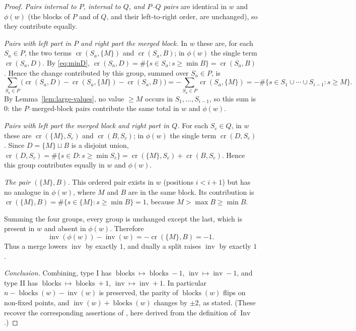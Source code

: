 \documentclass[11pt]{amsart}
\theoremstyle{definition}
\DeclareMathOperator{\inv}{inv}
\DeclareMathOperator{\Inv}{Inv}
\DeclareMathOperator{\blocks}{blocks}
\begin{document}
\begin{proof}
\emph{Pairs internal to $P$, internal to $Q$, and $P$–$Q$ pairs} are identical in
$w$ and $\phi(w)$ (the blocks of $P$ and of $Q$, and their left-to-right order,
are unchanged), so they contribute equally.

\emph{Pairs with left part in $P$ and right part the merged block.} In $w$ these
are, for each $S_a\in P$, the two terms $\operatorname{cr}(S_a,\{M\})$ and
$\operatorname{cr}(S_a,B)$; in $\phi(w)$ the single term
$\operatorname{cr}(S_a,D)$. By \eqref{eq:minD},
$\operatorname{cr}(S_a,D)=\#\{s\in S_a:s\ge\min B\}=\operatorname{cr}(S_a,B)$.
Hence the change contributed by this group, summed over $S_a\in P$, is
\[
\sum_{S_a\in P}\Big(\operatorname{cr}(S_a,D)-\operatorname{cr}(S_a,\{M\})-\operatorname{cr}(S_a,B)\Big)
=-\sum_{S_a\in P}\operatorname{cr}(S_a,\{M\})
=-\#\{s\in S_1\cup\cdots\cup S_{i-1}: s\ge M\}.
\]
By Lemma~\ref{lem:large-values}, no value $\ge M$ occurs in $S_1,\dots,S_{i-1}$,
so this sum is $0$: the $P$–merged-block pairs contribute the same total in $w$
and $\phi(w)$.

\emph{Pairs with left part the merged block and right part in $Q$.} For each
$S_c\in Q$, in $w$ these are $\operatorname{cr}(\{M\},S_c)$ and
$\operatorname{cr}(B,S_c)$; in $\phi(w)$ the single term
$\operatorname{cr}(D,S_c)$. Since $D=\{M\}\sqcup B$ is a disjoint union,
$\operatorname{cr}(D,S_c)=\#\{s\in D:s\ge\min S_c\}
=\operatorname{cr}(\{M\},S_c)+\operatorname{cr}(B,S_c)$. Hence this group
contributes equally in $w$ and $\phi(w)$.

\emph{The pair $(\{M\},B)$.} This ordered pair exists in $w$ (positions $i<i+1$)
but has no analogue in $\phi(w)$, where $M$ and $B$ are in the same block. Its
contribution is $\operatorname{cr}(\{M\},B)=\#\{s\in\{M\}:s\ge\min B\}=1$, because
$M>\max B\ge\min B$.

Summing the four groups, every group is unchanged except the last, which is
present in $w$ and absent in $\phi(w)$. Therefore
\[
\inv(\phi(w))-\inv(w)=-\operatorname{cr}(\{M\},B)=-1.
\]
Thus a merge lowers $\inv$ by exactly $1$, and dually a split raises $\inv$ by
exactly $1$.

\emph{Conclusion.} Combining, type I has $\blocks\mapsto\blocks-1$,
$\inv\mapsto\inv-1$, and type II has $\blocks\mapsto\blocks+1$,
$\inv\mapsto\inv+1$. In particular $n-\blocks(w)-\inv(w)$ is preserved, the parity
of $\blocks(w)$ flips on non-fixed points, and $\inv(w)+\blocks(w)$ changes by
$\pm2$, as stated. (These recover the corresponding assertions of
\cite[Section 5.1]{SaganSwanson2024}, here derived from the definition of
$\Inv$.)
\end{proof}
\end{document}

